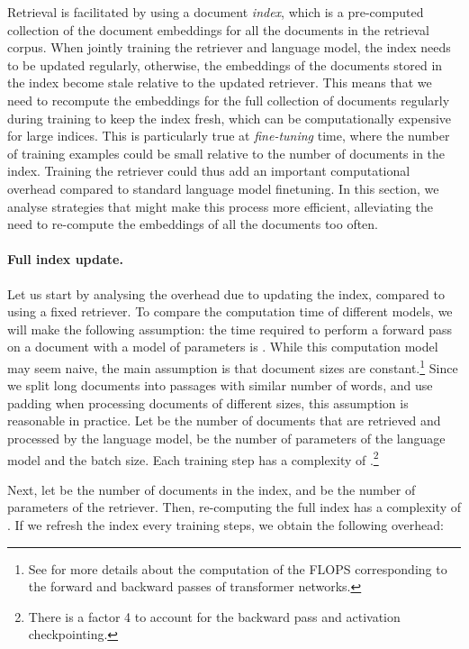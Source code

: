 \documentclass[10pt]{article} \usepackage[preprint]{tmlr}
\begin{document}
Retrieval is facilitated by using a document \emph{index}, which is a pre-computed collection of the document embeddings for all the documents in the retrieval corpus.
When jointly training the retriever and language model, the index
needs to be updated regularly, otherwise, the embeddings of the documents stored in the index become stale relative to the updated retriever.
This means that we need to recompute the embeddings for the full collection of documents regularly during training to keep the index fresh, which can be computationally expensive for large indices.
This is particularly true at \emph{fine-tuning} time, where the number of training examples could be small relative to the number of documents in the index.
Training the retriever could thus add an important computational overhead compared to standard language model finetuning.
In this section, we analyse strategies that might make this process more efficient, alleviating the need to re-compute the embeddings of all the documents too often.

\paragraph{Full index update.}
Let us start by analysing the overhead due to updating the index, compared to using a fixed retriever.
To compare the computation time of different models, we will make the following assumption:
the time required to perform a forward pass on a document with a model of  parameters is .
While this computation model may seem naive, the main assumption is that document sizes are constant.\footnote{See \citet{hoffmann2022chinchilla} for more details about the computation of the FLOPS corresponding to the forward and backward passes of transformer networks.}
Since we split long documents into passages with similar number of words, and use padding when processing documents of different sizes, this assumption is reasonable in practice.
Let  be the number of documents that are retrieved and processed by the language model,  be the number of parameters of the language model and  the batch size.
Each training step has a complexity of .\footnote{There is a factor 4 to account for the backward pass and activation checkpointing.}

Next, let  be the number of documents in the index, and  be the number of parameters of the retriever.
Then, re-computing the full index has a complexity of .
If we refresh the index every  training steps, we obtain the following overhead:
\end{document}
